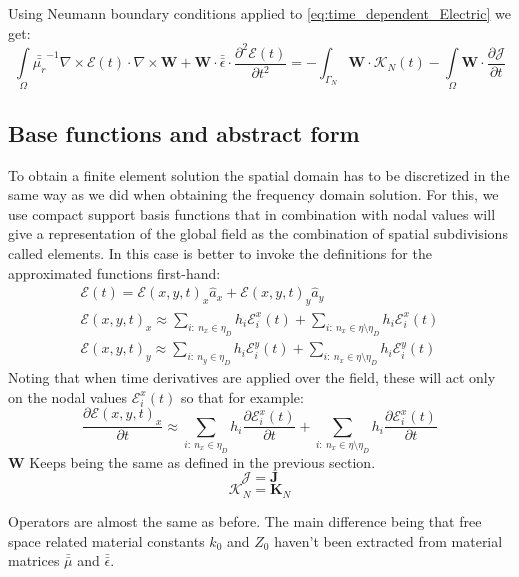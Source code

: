 Using Neumann boundary conditions applied to \ref{eq:time_dependent_Electric} we get:
\begin{equation}
\int\limits_{\Omega} \bar{\bar{\mu_r}}^{-1}\nabla\times \mathcal{E}(t)\cdot \nabla\times\mathbf{W}
+ \mathbf{W}\cdot\bar{\bar{\epsilon}}\cdot\frac{\partial ^2\mathcal{E}(t)}{\partial t^2}=-\int_{\Gamma_N}\mathbf{W}\cdot\mathcal{K}_N(t)
-\int\limits_{\Omega}\mathbf{W}\cdot\frac{\partial \mathcal{J}}{\partial t} \label{eq:td_weak_form_E_equation}
\end{equation}

\subsection{Base functions and abstract form}
To obtain a finite element solution the spatial domain has to be discretized in the same way as we did when obtaining the frequency domain solution. For this, we use compact support basis functions that in combination with nodal values will give a representation of the global field as the combination of spatial  subdivisions called elements.
In this case is better to invoke the definitions for the approximated functions first-hand:
\begin{align*}
\mathcal{E}(t)=\mathcal{E}(x,y,t)_x\hat{a}_x + \mathcal{E}(x,y,t)_y \hat{a}_y\\
\mathcal{E}(x,y,t)_x\approx \sum_{i:\ n_x \in \eta_D} h_i \mathcal{E}_i^x(t)+\sum_{i:\ n_x \in \eta\setminus\eta_D} h_i \mathcal{E}_i^x(t)\\
\mathcal{E}(x,y,t)_y\approx \sum_{i:\ n_y \in \eta_D}h_i\mathcal{E}_i^y(t)+
\sum_{i:\ n_x \in \eta\setminus\eta_D}h_i\mathcal{E}_i^y(t)
\end{align*}
Noting that when time derivatives are applied over the field, these will act only on the nodal values $\mathcal{E}_i^x(t)$ so that for example:
\[\frac{\partial \mathcal{E}(x,y,t)_x}{\partial t}\approx \sum_{i:\ n_x \in \eta_D} h_i \frac{\partial \mathcal{E}_i^x(t)}{\partial t}+\sum_{i:\ n_x \in \eta\setminus\eta_D} h_i \frac{\partial\mathcal{E}_i^x(t)}{\partial t}\]
$\mathbf{W}$ Keeps being the same as defined in the previous section.\[\mathcal{J}=\mathbf{J}\]
\[\mathcal{K}_N=\mathbf{K}_N\]

Operators are almost the same as before. The main difference being that free space related material constants $k_0$ and $Z_0$ haven't been extracted from material matrices $\bar{\bar{\mu}}$ and $\bar{\bar{\epsilon}}$.

